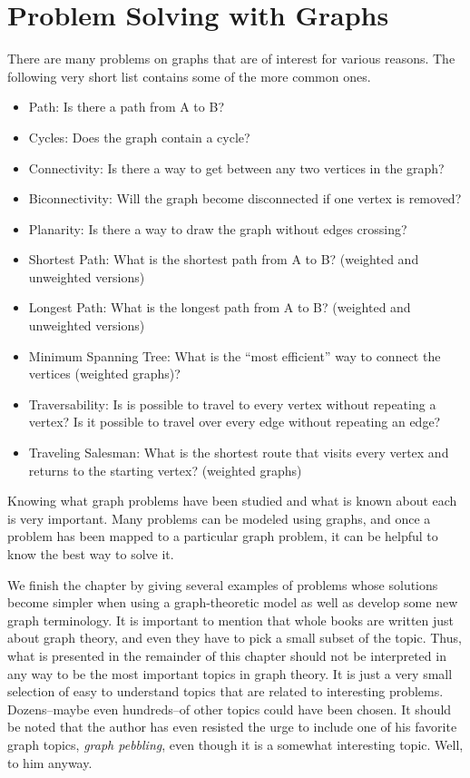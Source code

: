 \newpage

\section{Problem Solving with Graphs}\label{sec:GraphProbSolve}

There are many problems on graphs that are of interest for various reasons.
The following very short list contains some of the more common ones.

\begin{itemize}
\item  {\sc Path}: Is there a path from A to B?
\item {\sc Cycles}:
  Does the graph contain a cycle?
\item {\sc Connectivity}:
  Is there a way to get between any two vertices in the graph?
\item {\sc Biconnectivity}:
  Will the graph become disconnected if
  one vertex is removed?
\item {\sc Planarity}:
  Is there a way to draw the graph without
  edges crossing?
\item {\sc Shortest Path}:
  What is the shortest path from A to B? (weighted and unweighted versions)
\item {\sc Longest Path}:
  What is the longest path from A to B? (weighted and unweighted versions)
\item {\sc Minimum Spanning Tree}:
  What is the ``most efficient'' way to connect the vertices (weighted graphs)?
  \item {\sc Traversability}:
  Is is possible to travel to every vertex without repeating a vertex?
  Is it possible to travel over every edge without repeating an edge?
\item {\sc Traveling Salesman}:
  What is the shortest route that visits every vertex and returns to the starting vertex? 
  (weighted graphs)
\end{itemize}

Knowing what graph problems have been studied and what is known about each is
very important.  Many problems can be modeled using graphs, and once a problem
has been mapped to a particular graph problem, it can be helpful to know the best 
way to solve it.

We finish the chapter by giving several examples of problems whose solutions become
simpler when using a graph-theoretic model as well as develop some new
graph terminology. 
It is important to mention that whole books are written just about graph theory, 
and even they have to pick a small subset of the topic. Thus, what is presented in the
remainder of this chapter should not be interpreted in any way to be the most important
topics in graph theory. It is just a very small selection of easy to understand topics
that are related to interesting problems. Dozens--maybe even hundreds--of other topics
could have been chosen.
It should be noted that the author has even resisted the urge to include 
one of his favorite graph topics, {\em graph pebbling}, even though it is a somewhat
interesting topic. Well, to him anyway.


